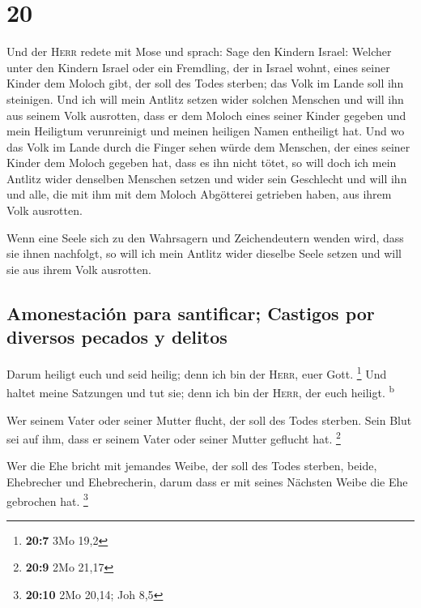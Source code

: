 \hypertarget{section-19}{%
\section{20}\label{section-19}}

 Und der \textsc{Herr} redete mit Mose und sprach:
 Sage den Kindern Israel: Welcher unter den Kindern Israel
oder ein Fremdling, der in Israel wohnt, eines seiner Kinder dem Moloch
gibt, der soll des Todes sterben; das Volk im Lande soll ihn steinigen.
 Und ich will mein Antlitz setzen wider solchen Menschen
und will ihn aus seinem Volk ausrotten, dass er dem Moloch eines seiner
Kinder gegeben und mein Heiligtum verunreinigt und meinen heiligen Namen
entheiligt hat.  Und wo das Volk im Lande durch die Finger
sehen würde dem Menschen, der eines seiner Kinder dem Moloch gegeben
hat, dass es ihn nicht tötet,  so will doch ich mein
Antlitz wider denselben Menschen setzen und wider sein Geschlecht und
will ihn und alle, die mit ihm mit dem Moloch Abgötterei getrieben
haben, aus ihrem Volk ausrotten.

 Wenn eine Seele sich zu den Wahrsagern und Zeichendeutern
wenden wird, dass sie ihnen nachfolgt, so will ich mein Antlitz wider
dieselbe Seele setzen und will sie aus ihrem Volk ausrotten.

\hypertarget{amonestaciuxf3n-para-santificar-castigos-por-diversos-pecados-y-delitos}{%
\subsection{Amonestación para santificar; Castigos por diversos pecados
y
delitos}\label{amonestaciuxf3n-para-santificar-castigos-por-diversos-pecados-y-delitos}}

 Darum heiligt euch und seid heilig; denn ich bin der
\textsc{Herr}, euer Gott. \footnote{\textbf{20:7} 3Mo 19,2}
 Und haltet meine Satzungen und tut sie; denn ich bin der
\textsc{Herr}, der euch heiligt. \textsuperscript{b}

 Wer seinem Vater oder seiner Mutter flucht, der soll des
Todes sterben. Sein Blut sei auf ihm, dass er seinem Vater oder seiner
Mutter geflucht hat. \footnote{\textbf{20:9} 2Mo 21,17}

 Wer die Ehe bricht mit jemandes Weibe, der soll des
Todes sterben, beide, Ehebrecher und Ehebrecherin, darum dass er mit
seines Nächsten Weibe die Ehe gebrochen hat. \footnote{\textbf{20:10}
  2Mo 20,14; Joh 8,5}

